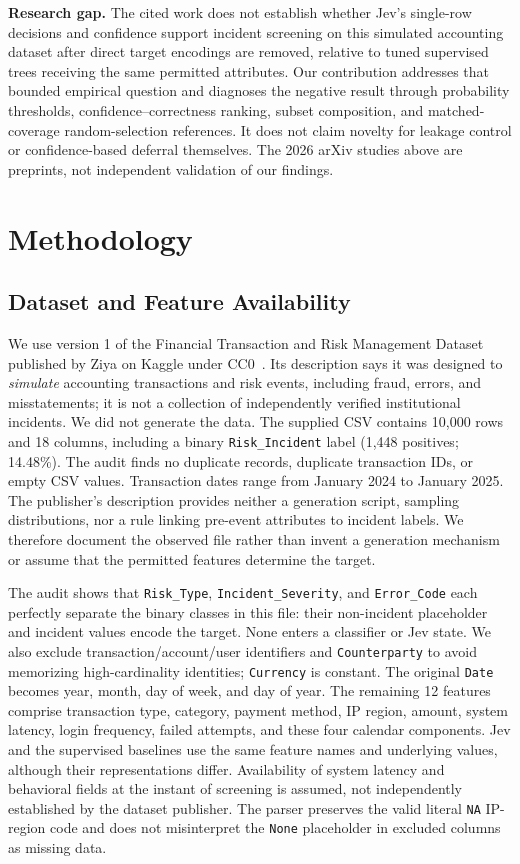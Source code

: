 \documentclass{llncs}
\begin{document}
\textbf{Research gap.} The cited work does not establish whether Jev's single-row decisions and confidence support incident screening on this simulated accounting dataset after direct target encodings are removed, relative to tuned supervised trees receiving the same permitted attributes. Our contribution addresses that bounded empirical question and diagnoses the negative result through probability thresholds, confidence--correctness ranking, subset composition, and matched-coverage random-selection references. It does not claim novelty for leakage control or confidence-based deferral themselves. The 2026 arXiv studies above are preprints, not independent validation of our findings.

\section{Methodology}\label{sec:method}

\subsection{Dataset and Feature Availability}

We use version 1 of the Financial Transaction and Risk Management Dataset published by Ziya on Kaggle under CC0~\cite{ziya2025dataset}. Its description says it was designed to \emph{simulate} accounting transactions and risk events, including fraud, errors, and misstatements; it is not a collection of independently verified institutional incidents. We did not generate the data. The supplied CSV contains 10,000 rows and 18 columns, including a binary \texttt{Risk\_Incident} label (1,448 positives; 14.48\%). The audit finds no duplicate records, duplicate transaction IDs, or empty CSV values. Transaction dates range from January 2024 to January 2025. The publisher's description provides neither a generation script, sampling distributions, nor a rule linking pre-event attributes to incident labels. We therefore document the observed file rather than invent a generation mechanism or assume that the permitted features determine the target.

The audit shows that \texttt{Risk\_Type}, \texttt{Incident\_Severity}, and \texttt{Error\_Code} each perfectly separate the binary classes in this file: their non-incident placeholder and incident values encode the target. None enters a classifier or Jev state. We also exclude transaction/account/user identifiers and \texttt{Counterparty} to avoid memorizing high-cardinality identities; \texttt{Currency} is constant. The original \texttt{Date} becomes year, month, day of week, and day of year. The remaining 12 features comprise transaction type, category, payment method, IP region, amount, system latency, login frequency, failed attempts, and these four calendar components. Jev and the supervised baselines use the same feature names and underlying values, although their representations differ. Availability of system latency and behavioral fields at the instant of screening is assumed, not independently established by the dataset publisher. The parser preserves the valid literal \texttt{NA} IP-region code and does not misinterpret the \texttt{None} placeholder in excluded columns as missing data.
\end{document}
